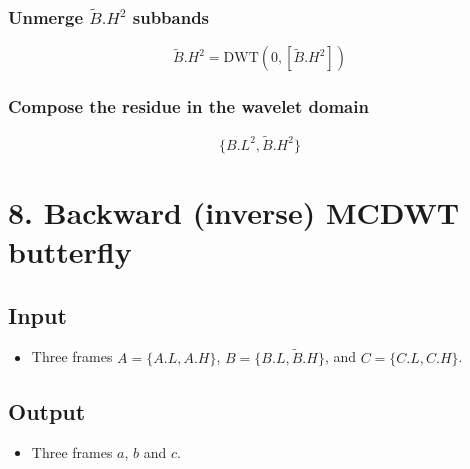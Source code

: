 {\subsubsection{Unmerge \(\tilde{B}.H^2\) subbands}
\begin{equation}
  \tilde{B}.H^2 = \text{DWT}(0, [\tilde{B}.H^2])
\end{equation}

\hypertarget{compose-the-residue-in-the-wavelet-domain}{%
\subsubsection{Compose the residue in the wavelet
domain}\label{compose-the-residue-in-the-wavelet-domain}}

\begin{equation}
   \{B.L^2, \tilde{B}.H^2\}
\end{equation}

\section{8. Backward (inverse) MCDWT butterfly}
\subsection{Input}
\begin{itemize}
\tightlist
\item
  Three frames \(A=\{A.L, A.H\}\), \(B=\{B.L, \tilde{B}.H\}\), and
  \(C=\{C.L, C.H\}\).
\end{itemize}

\subsection{Output}
\begin{itemize}
\tightlist
\item
  Three frames \(a\), \(b\) and \(c\).
\end{itemize}

}
